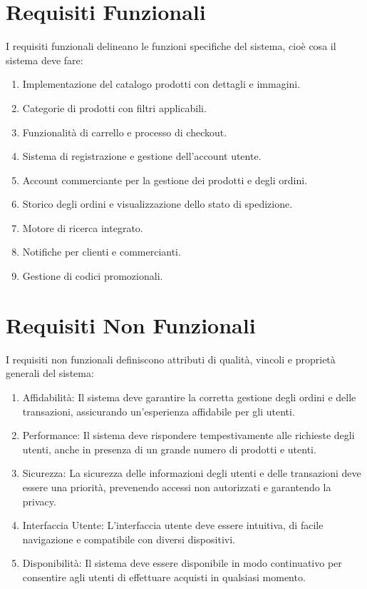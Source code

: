 \section{Requisiti Funzionali}
I requisiti funzionali delineano le funzioni specifiche del sistema, cioè cosa il sistema deve fare:
\begin{enumerate}
    \item Implementazione del catalogo prodotti con dettagli e immagini.
    \item Categorie di prodotti con filtri applicabili.
    \item Funzionalità di carrello e processo di checkout.
    \item Sistema di registrazione e gestione dell'account utente.
    \item Account commerciante per la gestione dei prodotti e degli ordini.
    \item Storico degli ordini e visualizzazione dello stato di spedizione.
    \item Motore di ricerca integrato.
    \item Notifiche per clienti e commercianti.
    \item Gestione di codici promozionali.
\end{enumerate}

\section{Requisiti Non Funzionali}
I requisiti non funzionali definiscono attributi di qualità, vincoli e proprietà generali del sistema:
\begin{enumerate}
    \item Affidabilità: Il sistema deve garantire la corretta gestione degli ordini e delle transazioni, assicurando un'esperienza affidabile per gli utenti.
    \item Performance: Il sistema deve rispondere tempestivamente alle richieste degli utenti, anche in presenza di un grande numero di prodotti e utenti.
    \item Sicurezza: La sicurezza delle informazioni degli utenti e delle transazioni deve essere una priorità, prevenendo accessi non autorizzati e garantendo la privacy.
    \item Interfaccia Utente: L'interfaccia utente deve essere intuitiva, di facile navigazione e compatibile con diversi dispositivi.
    \item Disponibilità: Il sistema deve essere disponibile in modo continuativo per consentire agli utenti di effettuare acquisti in qualsiasi momento.
\end{enumerate}

